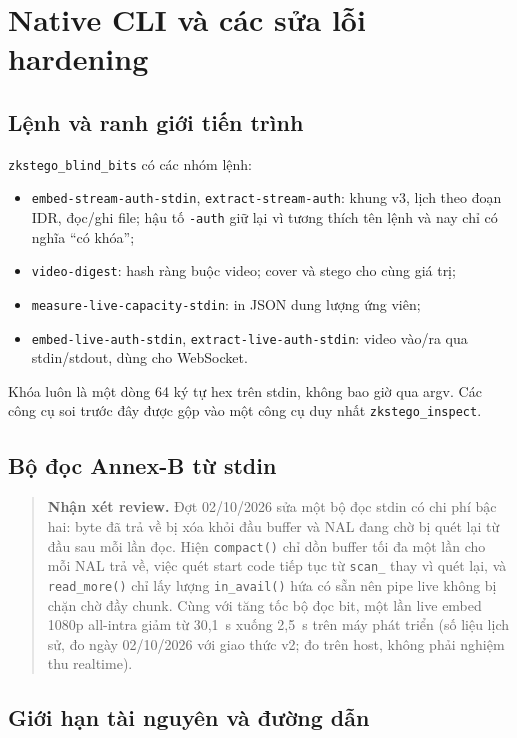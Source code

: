 \documentclass[10pt,a4paper]{article}
\newcommand{\srccpp}[3]{}
\newcommand{\review}[1]{\begin{quote}\colorbox{ReviewBg}{\parbox{0.94\linewidth}{\textbf{Nhận xét review.} #1}}\end{quote}}
\begin{document}
\section{Native CLI và các sửa lỗi hardening}

\subsection{Lệnh và ranh giới tiến trình}

\texttt{zkstego\_blind\_bits} có các nhóm lệnh:
\begin{itemize}
  \item \texttt{embed-stream-auth-stdin}, \texttt{extract-stream-auth}: khung v3, lịch theo đoạn IDR, đọc/ghi file; hậu tố \texttt{-auth} giữ lại vì tương thích tên lệnh và nay chỉ có nghĩa ``có khóa'';
  \item \texttt{video-digest}: hash ràng buộc video; cover và stego cho cùng giá trị;
  \item \texttt{measure-live-capacity-stdin}: in JSON dung lượng ứng viên;
  \item \texttt{embed-live-auth-stdin}, \texttt{extract-live-auth-stdin}: video vào/ra qua stdin/stdout, dùng cho WebSocket.
\end{itemize}
Khóa luôn là một dòng 64 ký tự hex trên stdin, không bao giờ qua argv. Các công cụ soi trước đây được gộp vào một công cụ duy nhất \texttt{zkstego\_inspect}.

\subsection{Bộ đọc Annex-B từ stdin}

\srccpp{native/src/cavlc_stream.cpp}{1237}{1282}

\review{Đợt 02/10/2026 sửa một bộ đọc stdin có chi phí bậc hai: byte đã trả về bị xóa khỏi đầu buffer và NAL đang chờ bị quét lại từ đầu sau mỗi lần đọc. Hiện \texttt{compact()} chỉ dồn buffer tối đa một lần cho mỗi NAL trả về, việc quét start code tiếp tục từ \texttt{scan\_} thay vì quét lại, và \texttt{read\_more()} chỉ lấy lượng \texttt{in\_avail()} hứa có sẵn nên pipe live không bị chặn chờ đầy chunk. Cùng với tăng tốc bộ đọc bit, một lần live embed 1080p all-intra giảm từ 30,1~s xuống 2,5~s trên máy phát triển (số liệu lịch sử, đo ngày 02/10/2026 với giao thức v2; đo trên host, không phải nghiệm thu realtime).}

\subsection{Giới hạn tài nguyên và đường dẫn}
\end{document}
